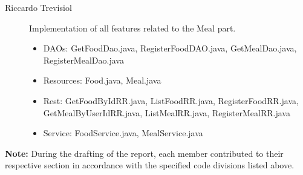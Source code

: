 \begin{description}
\item[Riccardo Trevisiol] Implementation of all features related to the Meal part.
    \begin{itemize}
        \item DAOs: GetFoodDao.java, RegisterFoodDAO.java, GetMealDao.java, RegisterMealDao.java
        \item Resources: Food.java, Meal.java
        \item Rest: GetFoodByIdRR.java, ListFoodRR.java, RegisterFoodRR.java, GetMealByUserIdRR.java, ListMealRR.java, RegisterMealRR.java
        \item Service: FoodService.java, MealService.java
    \end{itemize}

\end{description}
\textbf{Note:} During the drafting of the report, each member contributed to their respective section in accordance with the specified code divisions listed above.